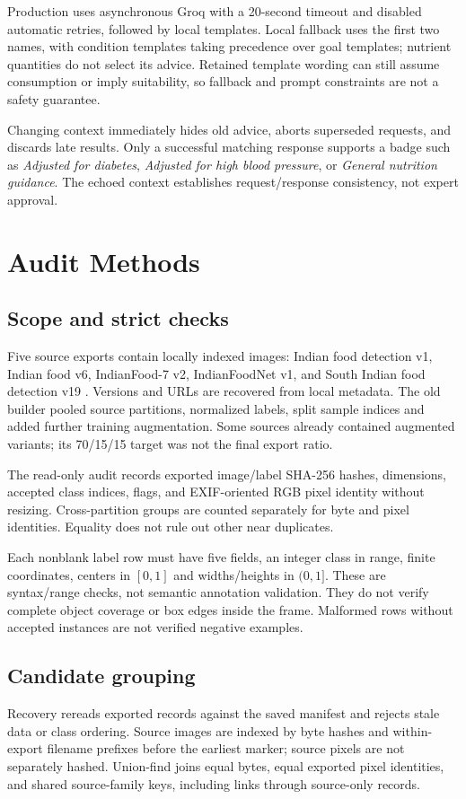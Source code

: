 \documentclass[conference]{IEEEtran}
\newcommand{\code}[1]{\texttt{\detokenize{#1}}}
\begin{document}
Production uses asynchronous Groq with a 20-second timeout and disabled automatic retries, followed by local templates. Local fallback uses the first two names, with condition templates taking precedence over goal templates; nutrient quantities do not select its advice. Retained template wording can still assume consumption or imply suitability, so fallback and prompt constraints are not a safety guarantee.

Changing context immediately hides old advice, aborts superseded requests, and discards late results. Only a successful matching response supports a badge such as \emph{Adjusted for diabetes}, \emph{Adjusted for high blood pressure}, or \emph{General nutrition guidance}. The echoed context establishes request/response consistency, not expert approval.

\section{Audit Methods}
\subsection{Scope and strict checks}
Five source exports contain \CandidateSourceImages{} locally indexed images: Indian food detection v1, Indian food v6, IndianFood-7 v2, IndianFoodNet v1, and South Indian food detection v19 \cite{source_project_z0tql,source_microplastics,source_indianfood7,source_indianfoodnet,source_south_indian}. Versions and URLs are recovered from local metadata. The old builder pooled source partitions, normalized labels, split sample indices and added further training augmentation. Some sources already contained augmented variants; its 70/15/15 target was not the final export ratio.

The read-only audit records exported image/label SHA-256 hashes, dimensions, accepted class indices, flags, and EXIF-oriented RGB pixel identity without resizing. Cross-partition groups are counted separately for byte and pixel identities. Equality does not rule out other near duplicates.

Each nonblank label row must have five fields, an integer class in range, finite coordinates, centers in $[0,1]$ and widths/heights in $(0,1]$. These are syntax/range checks, not semantic annotation validation. They do not verify complete object coverage or box edges inside the frame. Malformed rows without accepted instances are not verified negative examples.

\subsection{Candidate grouping}
Recovery rereads exported records against the saved manifest and rejects stale data or class ordering. Source images are indexed by byte hashes and within-export filename prefixes before the earliest \code{.rf.<32 hex>} marker; source pixels are not separately hashed. Union-find joins equal bytes, equal exported pixel identities, and shared source-family keys, including links through source-only records.
\end{document}

